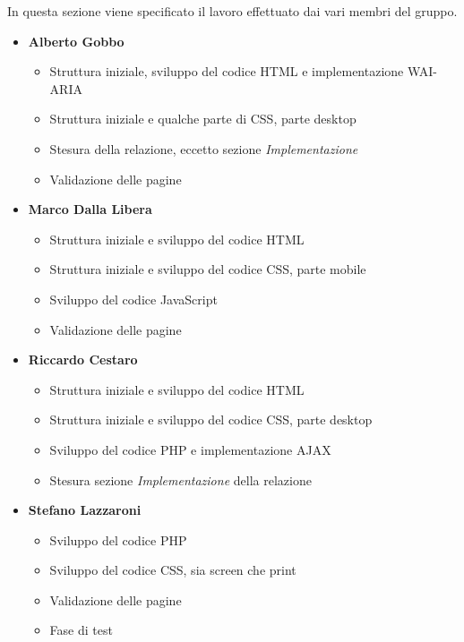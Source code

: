 In questa sezione viene specificato il lavoro effettuato dai vari membri del gruppo.
\begin{itemize}
	\item \textbf{Alberto Gobbo}
	\begin{itemize}
		\item Struttura iniziale, sviluppo del codice HTML e implementazione WAI-ARIA
		\item Struttura iniziale e qualche parte di CSS, parte desktop 
		\item Stesura della relazione, eccetto sezione \emph{Implementazione}
		\item Validazione delle pagine
	\end{itemize}	
	\item \textbf{Marco Dalla Libera}
	\begin{itemize}
		\item Struttura iniziale e sviluppo del codice HTML
		\item Struttura iniziale e sviluppo del codice CSS, parte mobile
		\item Sviluppo del codice JavaScript
		\item Validazione delle pagine
	\end{itemize}	
	\item \textbf{Riccardo Cestaro}
	\begin{itemize}
		\item Struttura iniziale e sviluppo del codice HTML
		\item Struttura iniziale e sviluppo del codice CSS, parte desktop
		\item Sviluppo del codice PHP e implementazione AJAX
		\item Stesura sezione \emph{Implementazione} della relazione
	\end{itemize}	
	\item \textbf{Stefano Lazzaroni}
	\begin{itemize}
		\item Sviluppo del codice PHP
		\item Sviluppo del codice CSS, sia screen che print
		\item Validazione delle pagine
		\item Fase di test 
	\end{itemize}	
\end{itemize}


